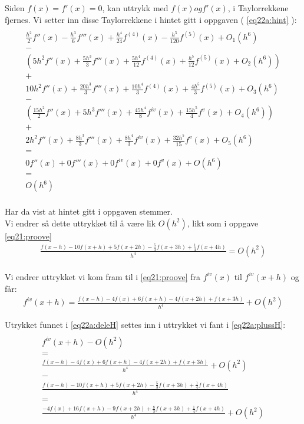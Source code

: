Siden $f(x) = f'(x) = 0$, kan uttrykk med $f(x) og f'(x)$, i Taylorrekkene fjernes. Vi setter inn disse Taylorrekkene i hintet gitt i oppgaven ( \ref{eq22a:hint} ): 
\begin{multline}
\\ \frac{h^2}{2}f''(x)-\frac{h^3}{6}f'''(x)+\frac{h^4}{24}f^{(4)}(x)-\frac{h^5}{120}f^{(5)}(x)+{O_1}(h^6) \\
-\\
(5{h^2}f''(x) + \frac{{5{h^3}}}{3}f'''(x) + \frac{{5{h^4}}}{{12}}{f^{(4)}}(x) + \frac{{{h^5}}}{{12}}{f^{(5)}}(x) + {O_2}(h^6)) \\
+ \\
10{h^2}f''(x) + \frac{{20{h^3}}}{3}f'''(x) + \frac{{10{h^4}}}{3}{f^{(4)}}(x) + \frac{{4{h^5}}}{3}{f^{(5)}}(x) + {O_3}(h^6) \\
- \\
(\frac{{15{h^2}}}{2}f''(x) + 5{h^3}f'''(x) + \frac{{45{h^4}}}{8}{f^{iv}}(x) + \frac{{15{h^5}}}{4}{f^v}(x) + {O_4}(h^6)) \\
+ \\
2{h^2}f''(x) + \frac{{8{h^3}}}{3}f'''(x) + \frac{{8{h^4}}}{3}{f^{iv}}(x) + \frac{{32{h^5}}}{{15}}{f^v}(x) + {O_5}(h^6) \\
= \\
0f''(x)+0f'''(x)+0f^{iv}(x)+0f^{v}(x)+O(h^6) \\
= \\
O(h^6) \\
\end{multline}


Har da vist at hintet gitt i oppgaven stemmer. \\ 
Vi endrer så dette uttrykket til å være lik $O(h^2)$, likt som i oppgave \ref{eq21:proove}
\begin{align}
\frac{f(x-h)-10f(x+h)+5f(x+2h)-\frac{5}{3}f(x+3h)+\frac{1}{4}f(x+4h)}{h^4}=O(h^2) 
\label{eq22a:deleH} \\ \nonumber
\end{align}


Vi endrer uttrykket vi kom fram til i \ref{eq21:proove} fra ${f^{iv}}(x)$ til ${f^{iv}}(x + h)$ og får: 
\begin{align}
{f^{iv}}(x + h) = \frac{{f(x - h) - 4f(x) + 6f(x + h) - 4f(x + 2h) + f(x + 3h)}}{{{h^4}}} + O({h^2}) \label{eq22a:plussH} 
\end{align}


Utrykket funnet i \ref{eq22a:deleH} settes inn i uttrykket vi fant i \ref{eq22a:plussH}:
\begin{multline}
\\{f^{iv}}(x + h) - O(h^2) \\
= \\
\frac{f(x-h)-4f(x)+6f(x+h)-4f(x+2h)+f(x+3h)}{h^4}+O(h^2) \\
- \\
\frac{f(x-h)-10f(x+h)+5f(x+2h)-\frac{5}{3}f(x+3h)+\frac{1}{4}f(x+4h)}{h^4} \\
= \\
\frac{-4f(x)+16f(x+h)-9f(x+2h)+\frac{8}{3}f(x+3h)+\frac{1}{4}f(x+4h)}{h^4}+O(h^2) \\ \nonumber \\ \nonumber
\end{multline}


